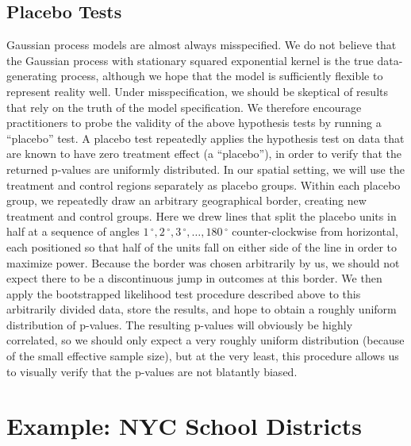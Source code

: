\documentclass[letter]{article}
\newcommand{\degree}{{\,^\circ}}
\begin{document}
    	\hypertarget{placebo-tests}{%
\subsection{Placebo Tests}\label{placebo-tests}}
    

\label{sec:placebo}
    	Gaussian process models are almost always misspecified.
We do not believe that the Gaussian process with stationary squared exponential kernel is the true data-generating process, although we hope that the model is sufficiently flexible to represent reality well.
Under misspecification, we should be skeptical of results that rely on the truth of the model specification.
We therefore encourage practitioners to probe the validity of the above hypothesis tests by running a ``placebo'' test.
A placebo test repeatedly applies the hypothesis test on data that are known to have zero treatment effect (a ``placebo''),
in order to verify that the returned p-values are uniformly distributed.
In our spatial setting, we will use the treatment and control regions separately as placebo groups.
Within each placebo group, we repeatedly draw an arbitrary geographical border, creating new treatment and control groups.
Here we drew lines that split the placebo units in half at a sequence of angles \(1\degree,2\degree,3\degree,\dotsc,180\degree\) counter-clockwise from horizontal, each positioned so that half of the units fall on either side of the line in order to maximize power.
Because the border was chosen arbitrarily by us, we should not expect there to be a discontinuous jump in outcomes at this border.
We then apply the bootstrapped likelihood test procedure described above to this arbitrarily divided data, store the results, and hope to obtain a roughly uniform distribution of p-values.
The resulting p-values will obviously be highly correlated, so we should only expect a very roughly uniform distribution (because of the small effective sample size), but at the very least, this procedure allows us to visually verify that the p-values are not blatantly biased.
    


    	\hypertarget{example-nyc-school-districts}{%
\section{Example: NYC School Districts}\label{example-nyc-school-districts}}

\label{sec:NYC_example}
\end{document}
